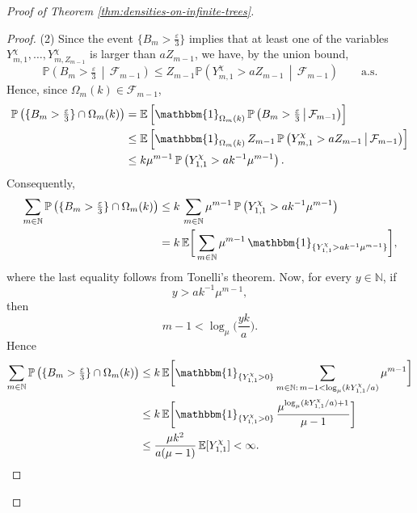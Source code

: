 \documentclass[11pt]{article}
\numberwithin{equation}{section}
\theoremstyle{plain}
\newcommand{\N}{\mathbb N}
\newcommand{\EE}{\mathbb E}
\newcommand{\PP}{\mathbb{P}}
\begin{document}
\begin{proof}[Proof of Theorem \ref{thm:densities-on-infinite-trees}]
\begin{proof}
\medskip\noindent
(2) Since the event $\{B_m>\tfrac{\varepsilon}{3}\}$ implies that at least one of the variables $Y_{m,1}^{\chi},\ldots,Y_{m,Z_{m-1}}^{\chi}$ is larger than $aZ_{m-1}$, we have, by the union bound,
\[
\PP\left( B_m>\tfrac{\varepsilon}{3} \,\middle|\, \mathcal{F}_{m-1}\right)
\leq Z_{m-1}\PP\left( Y_{m,1}^{\chi}>aZ_{m-1} \,\middle|\, \mathcal{F}_{m-1}\right)  \qquad \mathrm{a.s.}
\]
Hence, since $\Omega_m(k)\in\mathcal F_{m-1}$,
\[
\begin{aligned}
\PP\left(\{B_m>\tfrac{\varepsilon}{3}\}\cap\Omega_m(k)\right)
&
= \EE\left[ \mathbbm{1}_{\Omega_m(k)}\,\PP\left( B_m>\tfrac{\varepsilon}{3} \,\middle|\, \mathcal{F}_{m-1} \right) \right]
\\&
\leq \EE\left[ \mathbbm{1}_{\Omega_m(k)}\, Z_{m-1}\, \PP\left( Y_{m,1}^{\chi} > aZ_{m-1} \,\middle|\, \mathcal{F}_{m-1} \right) \right]
\\&
\leq k\mu^{m-1}\,\PP\left( Y_{1,1}^{\chi} > ak^{-1}\mu^{m-1} \right).
\end{aligned}
\]
Consequently,
\[
\begin{aligned}
\sum_{m\in\N} \PP\left( \{B_m>\tfrac{\varepsilon}{3}\}\cap\Omega_m(k) \right)
&
\leq k\, \sum_{m\in\N} \mu^{m-1}\, \PP\left( Y_{1,1}^{\chi} > ak^{-1}\mu^{m-1} \right)
\\&
= k\, \EE\bigg[ \sum_{m\in\N} \mu^{m-1}\, \mathbbm{1}_{\{Y_{1,1}^{\chi}>ak^{-1}\mu^{m-1}\}} \bigg],
\end{aligned}
\]
where the last equality follows from Tonelli's theorem. 
Now, for every $y\in\N$, if
\[
y > ak^{-1}\mu^{m-1},
\]
then
\[
m-1< \log_\mu\Big(\frac{yk}{a}\Big).
\]
Hence
\[
\begin{aligned}
\sum_{m\in\N}\PP\left(\{B_m>\tfrac{\varepsilon}{3}\}\cap\Omega_m(k)\right)
&
\leq
k\, \EE\bigg[\mathbbm{1}_{\{Y_{1,1}^{\chi}>0\}}\sum_{m\in\N:\, m-1<\log_{\mu}(kY_{1,1}^{\chi}/a)} \mu^{m-1} \bigg]
\\&
\leq k\, \EE\bigg[\mathbbm{1}_{\{Y_{1,1}^{\chi}>0\}}\, \frac{\mu^{\log_{\mu}(kY_{1,1}^{\chi}/a)+1}}{\mu-1}\bigg]
\\&
\leq \frac{\mu k^2}{a(\mu-1)}\,\EE[Y_{1,1}^{\chi}] < \infty.
\end{aligned}
\]
 

\end{proof}
\end{proof}
\end{document}
